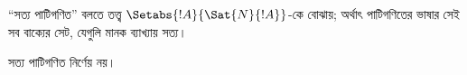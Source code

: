 \documentclass[../../../include/open-logic-section]{subfiles}
\begin{document}
``সত্য পাটিগণিত'' বলতে তত্ত্ব
$\Setabs{!A}{\Sat{N}{!A}}$-কে বোঝায়; অর্থাৎ পাটিগণিতের ভাষার সেই সব বাক্যের
সেট, যেগুলি মানক ব্যাখ্যায় সত্য।

\begin{cor}
সত্য পাটিগণিত নির্ণেয় নয়।
\end{cor}

\end{document}
